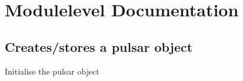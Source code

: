 \documentclass[letterpaper,10pt,english]{sphinxmanual}
\begin{document}
\sphinxstepscope


\chapter{Module\sphinxhyphen{}level Documentation}
\label{\detokenize{module-level-docs:module-level-documentation}}\label{\detokenize{module-level-docs:module-level-docs}}\label{\detokenize{module-level-docs::doc}}

\section{ \textendash{} Creates/stores a pulsar object}
\label{\detokenize{module-level-docs:module-pulsar}}\label{\detokenize{module-level-docs:pulsar-creates-stores-a-pulsar-object}}\label{\detokenize{module-level-docs:pulsar-module-docs}}

\begin{fulllineitems}
\label{\detokenize{module-level-docs:pulsar.Pulsar}}
\pysigstartsignatures
\pysigline
{}
\pysigstopsignatures
\end{fulllineitems}


\begin{fulllineitems}
\label{\detokenize{module-level-docs:pulsar.Pulsar.__init__}}
\pysigstartsignatures
\pysiglinewithargsret
{}
{}
{}
\pysigstopsignatures
\sphinxAtStartPar
Initialise the pulsar object

\end{fulllineitems}
\end{document}
